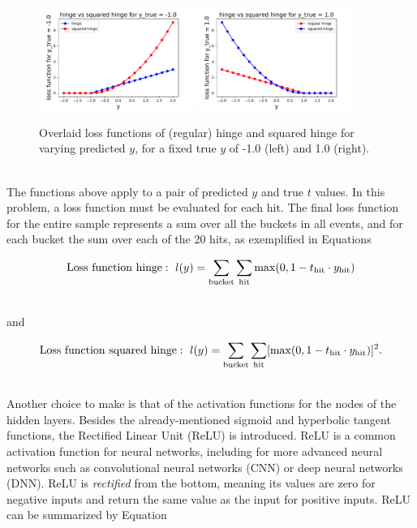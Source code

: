 \begin{figure}[htb]
\centering
\includegraphics[width=0.45\textwidth]{plots/LossFunctions_MinusOne.pdf}
\includegraphics[width=0.45\textwidth]{plots/LossFunctions_PlusOne.pdf}
\caption{Overlaid loss functions of (regular) hinge and squared hinge for varying predicted $y$, for a fixed true $y$ of -1.0 (left) and 1.0 (right).}
\label{fig:LossFunctions}
\end{figure}

\ \\The functions above apply to a pair of predicted $y$ and true $t$ values. In this problem, a loss function must be evaluated for each hit. The final loss function for the entire sample represents a sum over all the buckets in all events, and for each bucket the sum over each of the 20 hits, as exemplified in Equations

\begin{equation}
   \LossFunctionHinge:~l(y) = \sum_{\rm bucket} \sum_{\rm hit} \max(0, 1 - t_{\rm hit} \cdot y_{\rm hit})
\end{equation}

\ \\ and

\begin{equation}
   \LossFunctionSquaredHinge:~l(y) = \sum_{\rm bucket} \sum_{\rm hit} [\max(0, 1 - t_{\rm hit} \cdot y_{\rm hit})]^2.
\end{equation}

\ \\Another choice to make is that of the activation functions for the nodes of the hidden layers. Besides the already-mentioned sigmoid and hyperbolic tangent functions, the Rectified Linear Unit (ReLU) is introduced. ReLU is a common activation function for neural networks, including for more advanced neural networks such as convolutional neural networks (CNN) or deep neural networks (DNN). ReLU is \emph{rectified} from the bottom, meaning its values are zero for negative inputs and return the same value as the input for positive inputs. ReLU can be summarized by Equation


